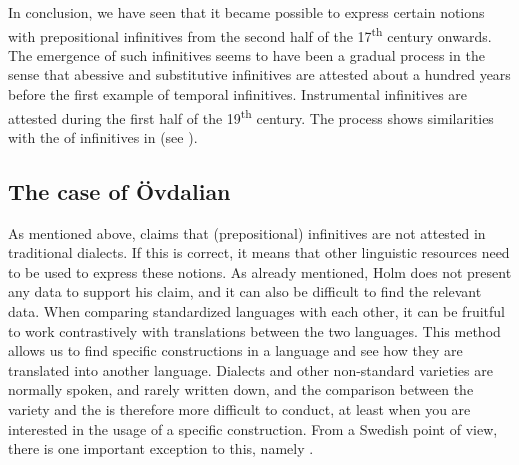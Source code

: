 \documentclass[output=paper]{langscibook}
\begin{document}
In conclusion, we have seen that it became possible to express certain  notions with prepositional infinitives from the second half of the 17\textsuperscript{th} century onwards. The emergence of such  infinitives seems to have been a gradual process in the sense that abessive and substitutive infinitives are attested about a hundred years before the first example of temporal infinitives. Instrumental infinitives are attested during the first half of the 19\textsuperscript{th} century. The process shows similarities with the  of  infinitives in  (see \citealt{Schulte2007Prepositional,Schulte2007What}). 


\subsection{The case of Övdalian}\label{sec:kalm:4.3}


As mentioned above, \citet[27]{Holm1967} claims that  (prepositional) infinitives are not attested in traditional dialects. If this is correct, it means that other linguistic resources need to be used to express these  notions. As already mentioned, Holm does not present any data to support his claim, and it can also be difficult to find the relevant data. When comparing standardized languages with each other, it can be fruitful to work contrastively with translations between the two languages. This method allows us to find specific constructions in a language and see how they are translated into another language. Dialects and other non-standard varieties are normally spoken, and rarely written down, and the comparison between the variety and the  is therefore more difficult to conduct, at least when you are interested in the usage of a specific construction. From a Swedish point of view, there is one important exception to this, namely . 
\end{document}
